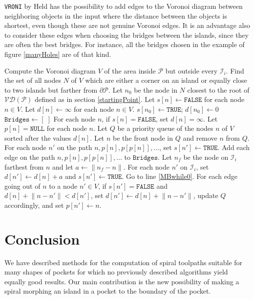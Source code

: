 \documentclass[3p]{elsarticle}
\newcommand{\VD}{\mathcal{VD}}
\newcommand{\PP}{\mathcal{P}}
\newcommand{\HH}{\mathcal{I}}
\newcommand{\bridges}{\texttt{Bridges}}
\newcommand{\makeBridges}{\texttt{Make}\bridges}
\begin{document}
\texttt{VRONI} by Held \cite{held2001}
has the possibility to add edges to the Voronoi diagram between
neighboring objects in the input where the distance between the objects is shortest,
even though these are not
genuine Voronoi edges. It is an advantage also to consider these edges when choosing
the bridges between the islands,
since they are often the best bridges. For instance, all the bridges chosen in the
example of figure \ref{manyHoles} are of that kind.

\begin{algorithm}[h]
\scriptsize
\LinesNumbered
\DontPrintSemicolon
\SetArgSty{}
Compute the Voronoi diagram $V$ of the area inside $\PP$ but outside every $\HH_i$.\;
Find the set of all nodes $N$ of $V$ which are either a corner on an island or
equally close to two islands but farther from
$\partial\PP$.\;
Let $n_0$ be the node in $N$ closest to the root of $\VD(\PP)$ defined as in section \ref{startingPoint}.\;
Let $s[n]\gets\texttt{FALSE}$ for each node $n\in V$.\;
Let $d[n]\gets\infty$ for each node $n\in V$.\;
$s[n_0]\gets\texttt{TRUE}$; $d[n_0]\gets 0$\;
$\bridges\gets [\; ]$\;
 { 
  For each node $n$, if $s[n]=\texttt{FALSE}$, set $d[n]=\infty$.\;
  Let $p[n]=\texttt{NULL}$ for each node $n$.\;
  Let $Q$ be a priority queue of the nodes $n$ of $V$ sorted after the values $d[n]$.\;
   { 
    Let $n$ be the front node in $Q$ and remove $n$ from $Q$.\;
    \If {$n$ is a corner on an island $\HH_i$ and $s[n]=\texttt{FALSE}$} {
      For each node $n'$ on the path $n,p[n],p[p[n]],\ldots$, set $s[n']\gets\texttt{TRUE}$.\;
      Add each edge on the path $n,p[n],p[p[n]],\ldots$ to $\bridges$.\;
      Let $n_f$ be the node on $\HH_i$ farthest from $n$ and let $a\gets\lVert n_f-n\rVert$.\;
      For each node $n'$ on $\HH_i$, set $d[n']\gets d[n]+a$ and $s[n']\gets \texttt{TRUE}$.\;
      Go to line \ref{MBwhile0}.\;
    }
    For each edge going out of $n$ to a node $n'\in V$,
    if $s[n']=\texttt{FALSE}$ and $d[n]+\lVert n-n'\rVert<d[n']$,
    set $d[n']\gets d[n]+\lVert n-n'\rVert$, update $Q$ accordingly, and set $p[n']\gets n$.\;  
  }
}
\caption{$\makeBridges(\PP,\HH_0,\ldots,\HH_{h-1})$}
\label{makeBridges}
\end{algorithm}

\section{Conclusion}\label{conclusion}
We have described methods for the computation of spiral toolpaths suitable for many
shapes of pockets for which no previously described algorithms yield equally good results.
Our main contribution is the new possibility of making a spiral morphing an island in a pocket
to the boundary of the pocket.
\end{document}
